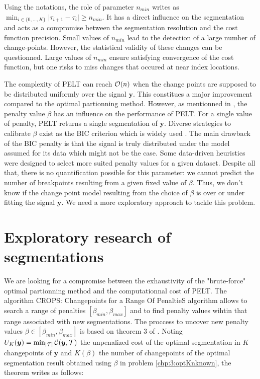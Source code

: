 Using the notations, the role of parameter $n_{min}$ writes as $\min_{i \in \{0,\dots,K\}}\lvert\tau_{i+1}-\tau_{i}\rvert \geq n_{min}$. It has a direct influence on the segmentation and acts as a compromise between the segmentation resolution and the cost function precision. Small values of $n_{min}$ lead to the detection of a large number of change-points. However, the statistical validity of these changes can be questionned. Large values of $n_{min}$ ensure satisfying convergence of the cost function, but one risks to miss changes that occured at near index locations.  
  
The complexity of PELT can reach ${\mathcal O}(n)$ when the change points are supposed to be distributed uniformly over the signal $\bm y$. This constitues a major improvement compared to the optimal partionning method. However, as mentionned in \cite{Haynes2016}, the penalty value $\beta$ has an influence on the performance of PELT. For a single value of penalty, PELT returns a single segmentation of $\bm y$. Diverse strategies to calibrate $\beta$ exist as the BIC criterion which is widely used \cite{YAO1988181,faure2016comparison,Shi2022}. The main drawback of the BIC penalty is that the signal is truly distributed under the model assumed for its data which might not be the case. Some data-driven heuristics \cite{Birge2006,Baudry2011,Bardet2012,arlot2009data} were designed to select more suited penalty values for a given dataset. Despite all that, there is no quantification possible for this parameter: we cannot predict the number of breakpoints resulting from a given fixed value of $\beta$. Thus, we don't know if the change point model resulting from the choice of $\beta$ is over or under fitting the signal $\bm y$. We need a more exploratory approach to tackle this problem.   

\section{Exploratory research of segmentations}\label{chp:3:3}

We are looking for a compromise between the exhaustivity of the "brute-force" optimal partionning method and the computationnal cost of PELT. The algorithm CROPS: Changepoints for a Range Of PenaltieS algorithm \cite{haynes2017} allows to search a range of penalties $[\beta_{min},\beta_{max}]$ and to find penalty values wihtin that range associated with new segmentations. The proccess to uncover new penalty values $\beta \in [\beta_{min},\beta_{max}]$ is based on theorem 3 of \cite{haynes2017}. Noting $U_K(\bm y) = \min_{\lvert{\mathcal T}\rvert} {\mathcal C}(\bm y,{\mathcal T})$ the unpenalized cost of the optimal segmentation in $K$ changepoints of $\bm y$ and $K(\beta)$ the number of changepoints of the optimal segmentation result obtained using $\beta$ in problem \ref{chp:3:optKnknown}, the theorem writes as follows:

